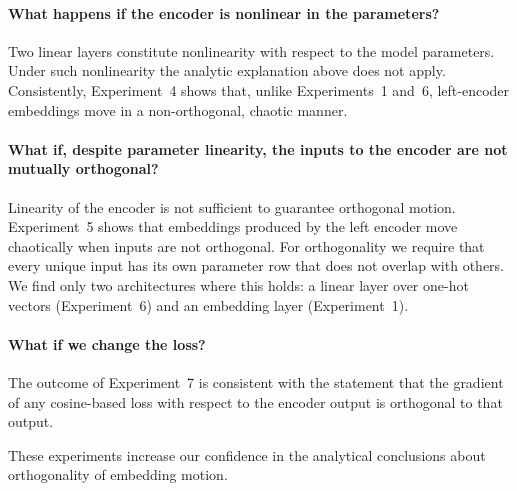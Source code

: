 \paragraph{What happens if the encoder is nonlinear in the parameters?}
Two linear layers constitute nonlinearity with respect to the model parameters. Under such nonlinearity the analytic explanation above does not apply. Consistently, Experiment~4 shows that, unlike Experiments~1 and~6, left-encoder embeddings move in a non-orthogonal, chaotic manner.

\paragraph{What if, despite parameter linearity, the inputs to the encoder are not mutually orthogonal?}
Linearity of the encoder is not sufficient to guarantee orthogonal motion. Experiment~5 shows that embeddings produced by the left encoder move chaotically when inputs are not orthogonal. For orthogonality we require that every unique input has its own parameter row that does not overlap with others. We find only two architectures where this holds: a linear layer over one-hot vectors (Experiment~6) and an embedding layer (Experiment~1).

\paragraph{What if we change the loss?}
The outcome of Experiment~7 is consistent with the statement that the gradient of any cosine-based loss with respect to the encoder output is orthogonal to that output.

These experiments increase our confidence in the analytical conclusions about orthogonality of embedding motion.

